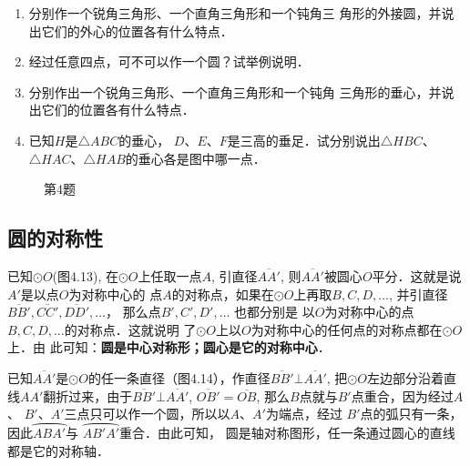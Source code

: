 \begin{ex}
\begin{enumerate}
    \item 分别作一个锐角三角形、一个直角三角形和一个钝角三
    角形的外接圆，并说出它们的外心的位置各有什么特点．
    \item 经过任意四点，可不可以作一个圆？试举例说明．
    \item 分别作出一个锐角三角形、一个直角三角形和一个钝角
    三角形的垂心，并说出它们的位置各有什么特点．
    \item 已知$H$是$\triangle ABC$的垂心，
    $D$、$E$、$F$是三高的垂足．试分别说出$\triangle HBC$、$\triangle HAC$、$\triangle HAB$的垂心各是图中哪一点．
\end{enumerate}
\end{ex}

\begin{figure}[htp]
    \centering
{}
    \caption*{第4题}
\end{figure}

\subsection{圆的对称性}
已知$\odot O$(图4.13), 在$\odot O$上任取一点$A$, 引直径$\overline{AA'}$, 
则$\overline{AA'}$被圆心$O$平分．这就是说$A'$是以点$O$为对称中心的
点$A$的对称点，如果在$\odot O$上再取$B,C,D,\ldots$, 并引直径
$\overline{BB'},\overline{CC'},\overline{DD'},\ldots$， 那么点$B',C',D',\ldots$ 也都分别是
以$O$为对称中心的点$B,C,D,\ldots$的对称点．这就说明
了$\odot O$上以$O$为对称中心的任何点的对称点都在$\odot O$上．由
此可知：\textbf{圆是中心对称形；圆心是它的对称中心}．

已知$\overline{AA'}$是$\odot O$的任一条直径（图4.14），作直径$\overline{BB'}\bot 
\overline{AA'}$, 把$\odot O$左边部分沿着直线$AA'$翻折过来，由于$\overline{BB'}\bot \overline{AA'}$, $\overline{OB'}=\overline{OB}$, 那么$B$点就与$B'$点重合，因为经过$A$、
$B'$、$A'$三点只可以作一个圆，所以以$A$、$A'$为端点，经过
$B'$点的弧只有一条，因此$\wideparen{ABA'}$与
$\wideparen{AB'A'}$重合．由此可知，
圆是轴对称图形，任一条通过圆心的直线都是它的对称轴．

